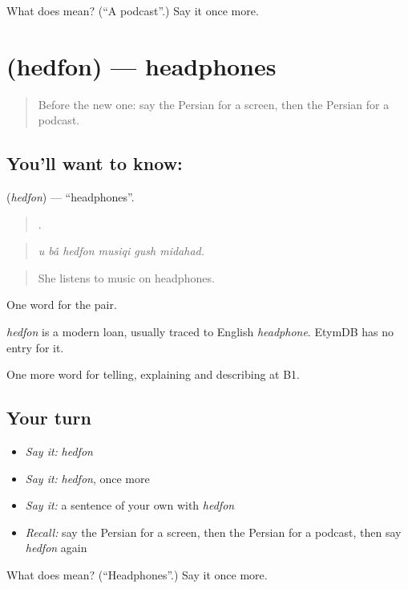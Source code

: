 \begin{tcolorbox}[breakable,colback=teal!4,colframe=teal!35!black,title={Before you move on}]
What does  mean? (\textquotedblleft{}A podcast\textquotedblright{}.) Say it once more.
\end{tcolorbox}
\section[\texorpdfstring{\fa{هدفون} (hedfon)}{هدفون (hedfon)}]{ (hedfon) — headphones}

\label{lesson:FA-C532-hedfon}



\begin{quote}
Before the new one: say the Persian for a screen, then the Persian for a podcast.
\end{quote}

\subsection*{You'll want to know: }
\textbf{} (\emph{hedfon}) — \textquotedblleft{}headphones\textquotedblright{}.

\begin{quote}
     .
\end{quote}

\begin{quote}
\emph{u bâ hedfon musiqi gush midahad.}
\end{quote}

\begin{quote}
She listens to music on headphones.
\end{quote}

One word for the pair.

\begin{cousinweb}
\emph{hedfon} is a modern loan, usually traced to English \emph{headphone}. EtymDB has no entry for it.
\end{cousinweb}

\begin{grammarlens}[title={What you've built}]
One more word for telling, explaining and describing at B1.
\end{grammarlens}

\subsection*{Your turn}
\begin{itemize}
\raggedright
  \item \emph{Say it:} \emph{hedfon}
  \item \emph{Say it:} \emph{hedfon}, once more
  \item \emph{Say it:} a sentence of your own with \emph{hedfon}
  \item \emph{Recall:} say the Persian for a screen, then the Persian for a podcast, then say \emph{hedfon} again
\end{itemize}

\begin{tcolorbox}[breakable,colback=teal!4,colframe=teal!35!black,title={Before you move on}]
What does  mean? (\textquotedblleft{}Headphones\textquotedblright{}.) Say it once more.
\end{tcolorbox}
